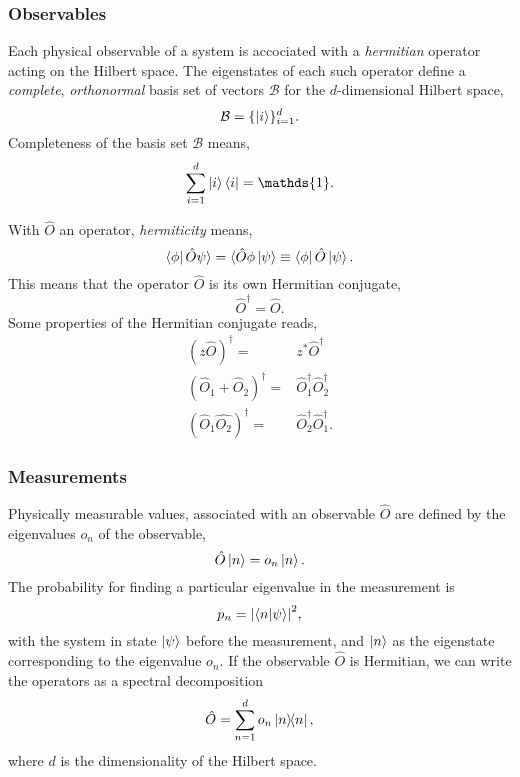     \subsubsection{Observables}
    Each physical observable of a system is accociated with a \emph{hermitian}
    operator acting on the Hilbert space. The eigenstates of each such
    operator define a \emph{complete}, \emph{orthonormal} basis set of vectors
    $\mathcal{B}$ for the $d$-dimensional Hilbert space,
    \begin{equation}
        \mathcal{B} = \{\ket{i}\}_{i=1}^d.
    \end{equation}
    Completeness of the basis set $\mathcal{B}$ means,
    \begin{equation}
        \sum_{i=1}^d \ket{i}\bra{i} = \mathds{1}.
    \end{equation}

    With $\hat{O}$ an operator, \emph{hermiticity} means,
    \begin{equation}
        \bra{\phi}\hat{O}\psi\rangle = \langle\hat{O}\phi\ket{\psi} \equiv \bra{\phi} \hat{O} \ket{\psi}.
    \end{equation}
    This means that the operator $\hat{O}$ is its own Hermitian conjugate,
    \begin{equation}
        \hat{O}^\dagger = \hat{O}.
    \end{equation}
    Some properties of the Hermitian conjugate reads,
    \begin{align}
       (z\hat{O})^\dagger =& z^*\hat{O}^\dagger \\
       (\hat{O}_1 + \hat{O}_2)^\dagger =& \hat{O}_1^\dagger \hat{O}_2^\dagger \\
       (\hat{O}_1\hat{O_2})^\dagger =& \hat{O}_2^\dagger \hat{O}_1^\dagger.
    \end{align}

    \subsubsection{Measurements}
    Physically measurable values, associated with an observable $\hat{O}$ are defined by the 
    eigenvalues $o_n$ of the observable,
    \begin{equation}
        \hat{O}\ket{n} = o_n\ket{n}.
    \end{equation}
    The probability for finding a particular eigenvalue in the measurement is
    \begin{equation}
        p_n = \abs{\braket{n}{\psi}}^2,
    \end{equation}
    with the system in state $\ket{\psi}$ before the measurement, and $\ket{n}$ as the 
    eigenstate corresponding to the eigenvalue $o_n$.
    If the observable $\hat{O}$ is Hermitian, we can write the operators as a spectral 
    decomposition 
    \begin{equation}
        \hat{O} = \sum_{n=1}^d o_n \dyad{n},
    \end{equation}
    where $d$ is the dimensionality of the Hilbert space.

